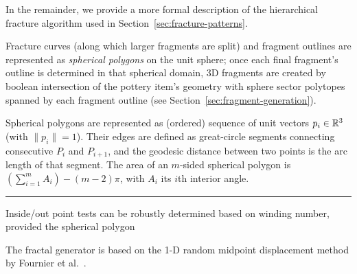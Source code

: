 \documentclass[acmlarge,screen,dvipsnames]{acmart}
\begin{document}
In the remainder, we provide a more formal description of the
hierarchical fracture algorithm used in
Section~\ref{sec:fracture-patterns}.

Fracture curves (along which larger fragments are split) and fragment
outlines are represented as \emph{spherical polygons} on the unit
sphere; once each final fragment's outline is determined in that
spherical domain, 3D fragments are created by boolean intersection of
the pottery item's geometry with sphere sector polytopes spanned by
each fragment outline (see Section~\ref{sec:fragment-generation}).

Spherical polygons are represented as (ordered) sequence of unit
vectors $p_i\in{\mathbb R}^3$ (with $\|p_i\|=1$). Their edges are defined as
great-circle segments connecting consecutive $P_i$ and $P_{i+1}$, and
the geodesic distance between two points is the arc length of that
segment. The area of an $m$-sided spherical polygon is $(\sum_{i=1}^m
A_i) - (m-2)\pi$, with $A_i$ its $i$th interior angle.

\hrule

Inside/out point tests can be robustly determined based on winding number, provided the spherical polygon 




The fractal generator is based on the 1-D random midpoint displacement
method by Fournier et al.~\cite{Fournier:1982:CRS:358523.358553}.
\end{document}
